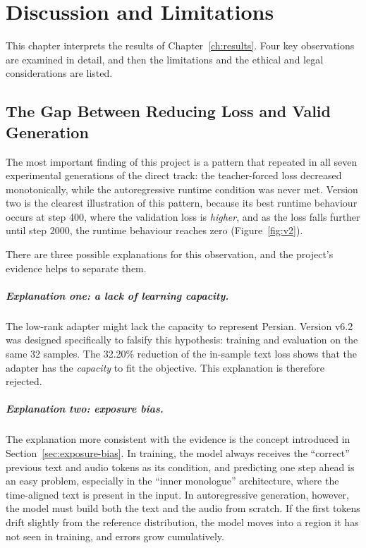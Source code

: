 \chapter{Discussion and Limitations}
\label{ch:discussion}

This chapter interprets the results of Chapter~\ref{ch:results}. Four key observations
are examined in detail, and then the limitations and the ethical and legal
considerations are listed.

\section{The Gap Between Reducing Loss and Valid Generation}
\label{sec:disc-gap}

The most important finding of this project is a pattern that repeated in all seven
experimental generations of the direct track: the teacher-forced loss decreased
monotonically, while the autoregressive runtime condition was never met. Version two is
the clearest illustration of this pattern, because its best runtime behaviour occurs at
step 400, where the validation loss is \emph{higher}, and as the loss falls further until
step 2000, the runtime behaviour reaches zero (Figure~\ref{fig:v2}).

There are three possible explanations for this observation, and the project's evidence
helps to separate them.

\paragraph{Explanation one: a lack of learning capacity.} The low-rank adapter might lack
the capacity to represent Persian. Version v6.2 was designed specifically to falsify this
hypothesis: training and evaluation on the same 32 samples. The 32.20\% reduction of the
in-sample text loss shows that the adapter has the \emph{capacity} to fit the objective. This
explanation is therefore rejected.

\paragraph{Explanation two: exposure bias.} The explanation more consistent with the
evidence is the concept introduced in Section~\ref{sec:exposure-bias}. In training, the model
always receives the ``correct'' previous text and audio tokens as its condition, and
predicting one step ahead is an easy problem, especially in the ``inner monologue''
architecture, where the time-aligned text is present in the input. In autoregressive
generation, however, the model must build both the text and the audio from scratch. If the
first tokens drift slightly from the reference distribution, the model moves into a region it
has not seen in training, and errors grow cumulatively.

